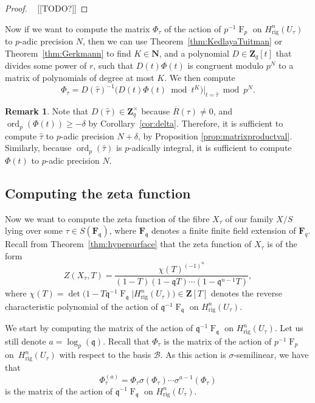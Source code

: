 \documentclass[a4paper,11pt]{article}
\numberwithin{equation}{section}
\newcommand{\NN}{\mathbf{N}} %
\newcommand{\ZZ}{\mathbf{Z}} %
\newcommand{\FF}{\mathbf{F}} %
\DeclareMathOperator{\ord}{ord}          %
\DeclareMathOperator{\Frob}{F}           %
\providecommand{\Hrig}{H_{\text{rig}}}  %
\providecommand{\cB}{\mathcal{B}} %
\theoremstyle{definition}
\newtheorem{rem}[thm]{Remark}
\begin{document}
\begin{proof} \mbox{ }
[[TODO?]]
\end{proof}

Now if we want to compute the matrix $\Phi_{\tau}$ of the action of 
$p^{-1} \Frob_p$ on $\Hrig^{n}(U_{\tau})$ to $p$-adic precision $N$, 
then we can use Theorem~\ref{thm:KedlayaTuitman} or Theorem~\ref{thm:Gerkmann}
to find $K \in \NN$, 
and a polynomial $D \in \ZZ_q[t]$ that divides some power of $r$, such that 
$D(t) \Phi(t)$ is congruent modulo $p^N$ to a matrix of polynomials of degree 
at most $K$. 
We then compute
\begin{equation*}
\Phi_{\tau} = D(\hat{\tau})^{-1} \bigl( D(t) \Phi(t) \bmod{t^{K}} \bigr)|_{t=\hat{\tau}} \bmod{p^{N}}.
\end{equation*}

\begin{rem} \label{rem:prectau}
Note that $D(\hat{\tau}) \in \ZZ_q^{\times}$ because $\overline{R}(\tau) \neq 0$, 
and $\ord_p(\Phi(t)) \geq -\delta$ by Corollary~\ref{cor:delta}. Therefore, it 
is sufficient to compute $\hat{\tau}$ to $p$-adic precision $N+\delta$, by
Proposition \ref{prop:matrixproductval}. Similarly, because $\ord_p(\hat{\tau})$ 
is $p$-adically integral, it is sufficient to compute $\Phi(t)$ to $p$-adic 
precision $N$.
\end{rem}

\subsection{Computing the zeta function}
\label{sec:ZetaFunctions}

Now we want to compute the zeta function of the fibre $X_{\tau}$ of
our family $X/S$ lying over some $\tau \in S(\FF_{\mathfrak{q}})$, 
where $\FF_{\mathfrak{q}}$ denotes a finite finite field extension of $\FF_q$.  
Recall from Theorem~\ref{thm:hypersurface} 
that the zeta function of $X_{\tau}$ is of the form
\begin{equation*}
Z(X_{\tau},T) = \frac{\chi(T)^{(-1)^n}}{(1 - T) (1 - \mathfrak{q}T) \dotsm (1 - \mathfrak{q}^{n-1}T)},
\end{equation*}
where $\chi(T) = \det \bigl( 1 - T \mathfrak{q}^{-1} \Frob_{\mathfrak{q}} | \Hrig^n(U_{\tau}) \bigr) \in \ZZ[T]$ 
denotes the reverse characteristic polynomial of the action 
of $\mathfrak{q}^{-1} \Frob_{\mathfrak{q}}$ 
on $\Hrig^n(U_{\tau})$.

We start by computing the matrix of the action 
of $\mathfrak{q}^{-1} \Frob_{\mathfrak{q}}$ on $\Hrig^n(U_{\tau})$. 
Let us still denote $a=\log_p(\mathfrak{q})$. Recall that $\Phi_{\tau}$ 
is the matrix of the action of $p^{-1} \Frob_p$ on~$\Hrig^{n}(U_{\tau})$ 
with respect to the basis $\cB$. As this action is $\sigma$-semilinear, 
we have that 
\begin{equation*}
\Phi_{\tau}^{(a)} = 
    \Phi_{\tau} \sigma(\Phi_{\tau}) \dotsm \sigma^{a-1}(\Phi_{\tau})
\end{equation*}
is the matrix of the action of $\mathfrak{q}^{-1} \Frob_{\mathfrak{q}}$ 
on $\Hrig^n(U_{\tau})$. 
\end{document}
